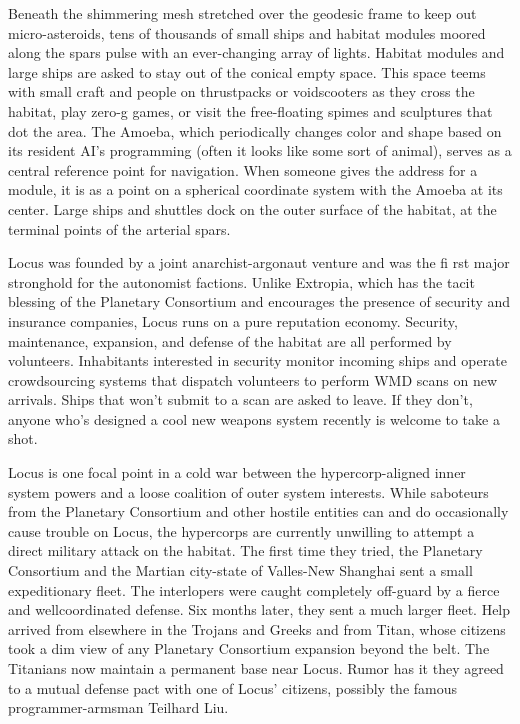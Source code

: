 Beneath the shimmering mesh stretched over the geodesic frame to keep
out micro-asteroids, tens of thousands of small ships and habitat
modules moored along the spars pulse with an ever-changing array of
lights. Habitat modules and large ships are asked to stay out of the
conical empty space. This space teems with small craft and people on
thrustpacks or voidscooters as they cross the habitat, play zero-g
games, or visit the free-floating spimes and sculptures that dot the
area. The Amoeba, which periodically changes color and shape based on
its resident AI's programming (often it looks like some sort of
animal), serves as a central reference point for navigation.  When
someone gives the address for a module, it is as a point on a
spherical coordinate system with the Amoeba at its center. Large ships
and shuttles dock on the outer surface of the habitat, at the terminal
points of the arterial spars.

Locus was founded by a joint anarchist-argonaut venture and was the fi
rst major stronghold for the autonomist factions. Unlike Extropia,
which has the tacit blessing of the Planetary Consortium and
encourages the presence of security and insurance companies, Locus
runs on a pure reputation economy. Security, maintenance, expansion,
and defense of the habitat are all performed by
volunteers. Inhabitants interested in security monitor incoming ships
and operate crowdsourcing systems that dispatch volunteers to perform
WMD scans on new arrivals. Ships that won't submit to a scan are asked
to leave. If they don't, anyone who's designed a cool new weapons
system recently is welcome to take a shot.

Locus is one focal point in a cold war between the hypercorp-aligned
inner system powers and a loose coalition of outer system
interests. While saboteurs from the Planetary Consortium and other
hostile entities can and do occasionally cause trouble on Locus, the
hypercorps are currently unwilling to attempt a direct military attack
on the habitat. The first time they tried, the Planetary Consortium
and the Martian city-state of Valles-New Shanghai sent a small
expeditionary fleet. The interlopers were caught completely off-guard
by a fierce and wellcoordinated defense. Six months later, they sent a
much larger fleet. Help arrived from elsewhere in the Trojans and
Greeks and from Titan, whose citizens took a dim view of any Planetary
Consortium expansion beyond the belt. The Titanians now maintain a
permanent base near Locus. Rumor has it they agreed to a mutual
defense pact with one of Locus' citizens, possibly the famous
programmer-armsman Teilhard Liu.

